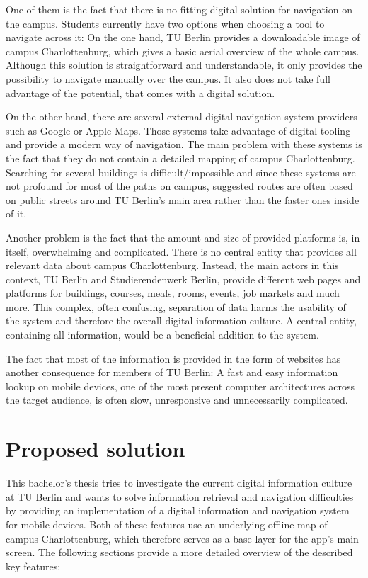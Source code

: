 One of them is the fact that there is no fitting digital solution for navigation on the campus. Students currently have two options when choosing a tool to navigate across it: On the one hand, TU Berlin provides a downloadable image of campus Charlottenburg, which gives a basic aerial overview of the whole campus. Although this solution is straightforward and understandable, it only provides the possibility to navigate manually over the campus. It also does not take full advantage of the potential, that comes with a digital solution.

On the other hand, there are several external digital navigation system providers such as Google or Apple Maps. Those systems take advantage of digital tooling and provide a modern way of navigation. The main problem with these systems is the fact that they do not contain a detailed mapping of campus Charlottenburg. Searching for several buildings is difficult/impossible and since these systems are not profound for most of the paths on campus, suggested routes are often based on public streets around TU Berlin's main area rather than the faster ones inside of it.

Another problem is the fact that the amount and size of provided platforms is, in itself, overwhelming and complicated. There is no central entity that provides all relevant data about campus Charlottenburg. Instead, the main actors in this context, TU Berlin and Studierendenwerk Berlin, provide different web pages and platforms for buildings, courses, meals, rooms, events, job markets and much more. This complex, often confusing, separation of data harms the usability of the system and therefore the overall digital information culture. A central entity, containing all information, would be a beneficial addition to the system.

The fact that most of the information is provided in the form of websites has another consequence for members of TU Berlin: A fast and easy information lookup on mobile devices, one of the most present computer architectures across the target audience, is often slow, unresponsive and unnecessarily complicated.

\section{Proposed solution}
This bachelor's thesis tries to investigate the current digital information culture at TU Berlin and wants to solve information retrieval and navigation difficulties by providing an implementation of a digital information and navigation system for mobile devices. Both of these features use an underlying offline map of campus Charlottenburg, which therefore serves as a base layer for the app's main screen. The following sections provide a more detailed overview of the described key features:

